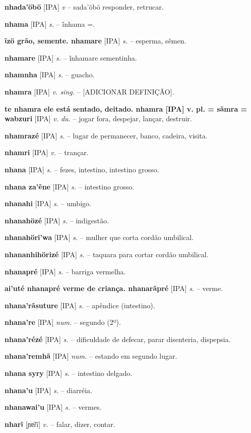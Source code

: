 \textbf{nhada'öbö} [IPA] \textit{v} -- sada'öbö responder, retrucar.

\textbf{nhama} [IPA] \textit{s.} -- ĩnhama =.

\textbf{ĩzö grão, semente. nhamare} [IPA] \textit{s.} -- esperma, sêmen.

\textbf{nhamare} [IPA] \textit{s.} -- ĩnhamare sementinha.

\textbf{nhamnha} [IPA] \textit{s.} -- guacho.

\textbf{nhamra} [IPA] \textit{v. sing.} -- [ADICIONAR DEFINIÇÃO].

\textbf{te nhamra ele está sentado, deitado. nhamra [IPA] v. pl. = sãmra = wabzuri} [IPA] \textit{v. du.} -- jogar fora, despejar, lançar, destruir.

\textbf{nhamrazé} [IPA] \textit{s.} -- lugar de permanecer, banco, cadeira, visita.

\textbf{nhamri} [IPA] \textit{v.} -- trançar.

\textbf{nhana} [IPA] \textit{s.} -- fezes, intestino, intestino grosso.

\textbf{nhana za'ẽne} [IPA] \textit{s.} -- intestino grosso.

\textbf{nhanahi} [IPA] \textit{s.} -- umbigo.

\textbf{nhanahözé} [IPA] \textit{s.} -- indigestão.

\textbf{nhanahöri'wa} [IPA] \textit{s.} -- mulher que corta cordão umbilical.

\textbf{nhananhihörizé} [IPA] \textit{s.} -- taquara para cortar cordão umbilical.

\textbf{nhanapré} [IPA] \textit{s.} -- barriga vermelha.

\textbf{ai'uté nhanapré verme de criança. nhanarãpré} [IPA] \textit{s.} -- verme.

\textbf{nhana'rãsuture} [IPA] \textit{s.} -- apêndice (intestino).

\textbf{nhana're} [IPA] \textit{num.} -- segundo (2º).

\textbf{nhana'rézé} [IPA] \textit{s.} -- dificuldade de defecar, parar disenteria, dispepsia.

\textbf{nhana'remhã} [IPA] \textit{num.} -- estando em segundo lugar.

\textbf{nhana syry} [IPA] \textit{s.} -- intestino delgado.

\textbf{nhana'u} [IPA] \textit{s.} -- diarréia.

\textbf{nhanawai'u} [IPA] \textit{s.} -- vermes.

\textbf{nharĩ} [ɲɐ̃ɾĩ] \textit{v.} -- falar, dizer, contar.

